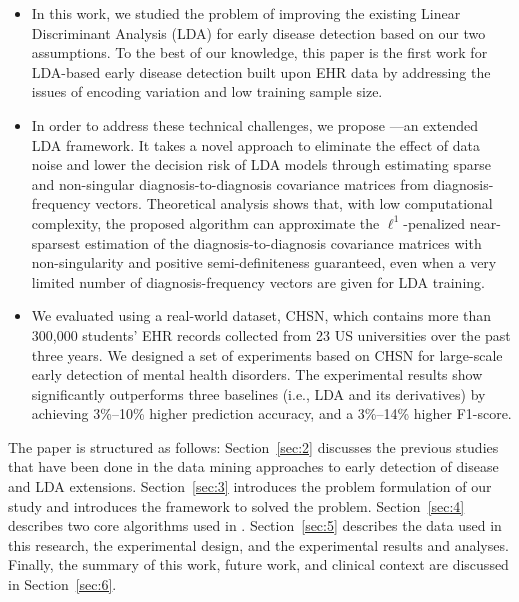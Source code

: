\begin{itemize}

\item In this work, we studied the problem of improving the existing Linear Discriminant Analysis (LDA) for early disease detection based on our two assumptions.
To the best of our knowledge, this paper is the first work for LDA-based early disease detection built upon EHR data by addressing the issues of encoding variation and low training sample size.


\item In order to address these technical challenges, we propose \TheName{}---an extended LDA framework.
It takes a novel approach to eliminate the effect of data noise and lower the decision risk of LDA models through estimating sparse and non-singular diagnosis-to-diagnosis covariance matrices from diagnosis-frequency vectors.
Theoretical analysis shows that, with low computational complexity, the proposed algorithm can approximate the $\ell^1$-penalized near-sparsest estimation of the diagnosis-to-diagnosis covariance matrices with non-singularity and positive semi-definiteness guaranteed, even when a very limited number of diagnosis-frequency vectors are given for LDA training.


\item We evaluated \TheName{} using a real-world dataset, CHSN, which contains more than 300,000 students' EHR records collected from 23 US universities over the past three years. %
We designed a set of experiments based on CHSN for large-scale early detection of mental health disorders.
The experimental results show \TheName{} significantly outperforms three baselines (i.e., LDA and its derivatives) by achieving 3\%--10\% higher prediction accuracy, and a 3\%--14\% higher F1-score.


\end{itemize}


The paper is structured as follows: Section~\ref{sec:2} discusses the previous studies that have been done in the data mining approaches to early detection of disease and LDA extensions.
Section~\ref{sec:3} introduces the problem formulation of our study and introduces the  \TheName{} framework to solved the problem.
Section~\ref{sec:4} describes two core algorithms used in \TheName{}.
Section~\ref{sec:5} describes the data used in this research, the experimental design, and the experimental results and analyses.
Finally, the summary of this work, future work, and clinical context are discussed in Section~\ref{sec:6}.
 

